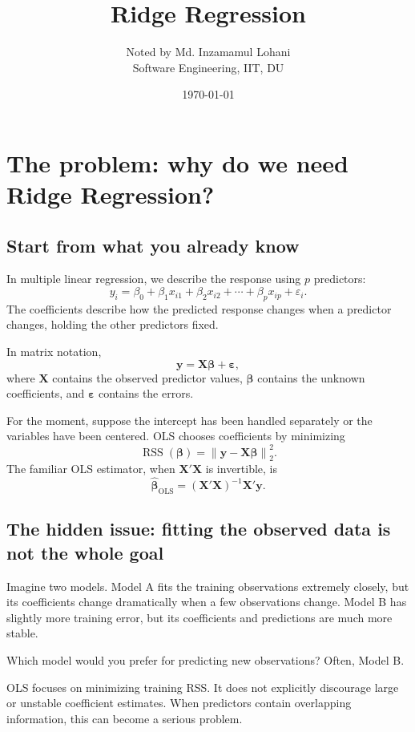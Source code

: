 \documentclass[11pt,a4paper,oneside]{book}
\title{\Huge\bfseries Ridge Regression\\[0.2em]}
\author{Noted by Md. Inzamamul Lohani\\
Software Engineering, IIT, DU}
\date{\today}
\theoremstyle{remark}
\newcommand{\X}{\mathbf X}
\newcommand{\y}{\mathbf y}
\newcommand{\bta}{\boldsymbol{\beta}}
\newcommand{\bhat}{\widehat{\boldsymbol{\beta}}}
\newcommand{\RSS}{\operatorname{RSS}}
\newcommand{\norm}[1]{\left\lVert #1\right\rVert_2}
\begin{document}
\hypersetup{pageanchor=false}
\maketitle
\hypersetup{pageanchor=true}
\frontmatter

\tableofcontents
\mainmatter

\chapter{The problem: why do we need Ridge Regression?}

\section{Start from what you already know}
In multiple linear regression, we describe the response using $p$ predictors:
\[
y_i=\beta_0+\beta_1x_{i1}+\beta_2x_{i2}+\cdots+\beta_px_{ip}
+\varepsilon_i.
\]
The coefficients describe how the predicted response changes when a
predictor changes, holding the other predictors fixed.

In matrix notation,
\[
\boxed{\y=\X\bta+\boldsymbol{\varepsilon}},
\]
where $\X$ contains the observed predictor values, $\bta$ contains the
unknown coefficients, and $\boldsymbol{\varepsilon}$ contains the errors.

For the moment, suppose the intercept has been handled separately or the
variables have been centered. OLS chooses coefficients by minimizing
\[
\boxed{\RSS(\bta)=\norm{\y-\X\bta}^2.}
\]
The familiar OLS estimator, when $\X'\X$ is invertible, is
\[
\boxed{\bhat_{\mathrm{OLS}}=(\X'\X)^{-1}\X'\y.}
\]

\section{The hidden issue: fitting the observed data is not the whole goal}
Imagine two models. Model A fits the training observations extremely closely,
but its coefficients change dramatically when a few observations change.
Model B has slightly more training error, but its coefficients and predictions
are much more stable.

Which model would you prefer for predicting new observations? Often, Model B.

OLS focuses on minimizing training RSS. It does not explicitly discourage
large or unstable coefficient estimates. When predictors contain overlapping
information, this can become a serious problem.
\end{document}
